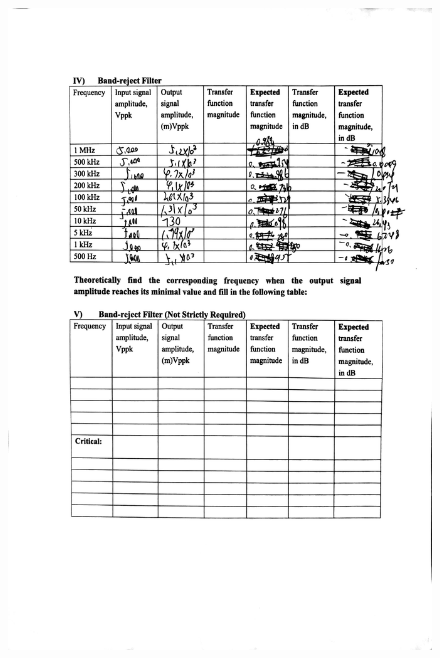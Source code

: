 \documentclass[a4paper]{report}
\begin{document}
\begin{figure}[H]
	\centering
	\includegraphics[width=1\linewidth]{15.jpg}
\end{figure}
\end{document}
